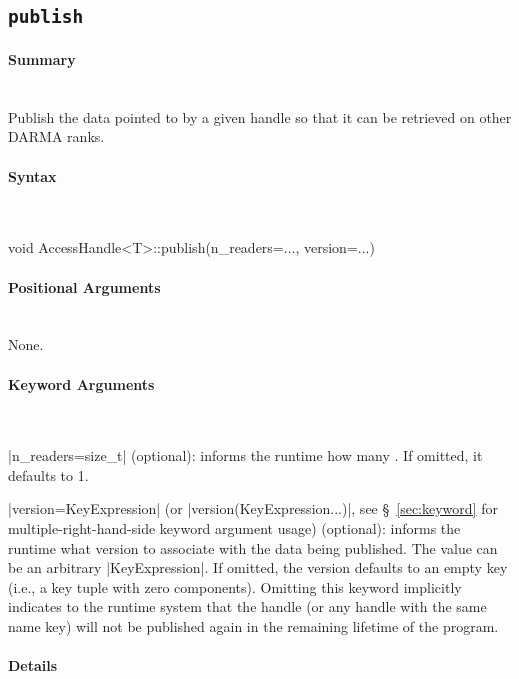 \subsection{\texttt{publish}}
\label{ssec:api_fe_publish}

\paragraph{Summary} \mbox{}\\
Publish the data pointed to by a given handle so that it can be retrieved on 
other DARMA ranks.

\paragraph{Syntax} \mbox{}\\
\begin{CppCode}
void
AccessHandle<T>::publish(n_readers=..., version=...)
\end{CppCode}

\paragraph{Positional Arguments} \mbox{}\\
None.

\paragraph{Keyword Arguments} \mbox{}\\
\begin{compactitem}
\item |n_readers=size_t| (optional): informs the runtime how many .
If omitted, it defaults to 1.
\item |version=KeyExpression| (or |version(KeyExpression...)|,
see \S~\ref{sec:keyword} for multiple-right-hand-side keyword argument usage)
(optional):
informs the runtime what version to associate with the data being published. 
The value can be an arbitrary |KeyExpression|.
If omitted, the version defaults to an empty key (i.e., a key tuple with zero 
components).  Omitting this keyword implicitly indicates to the runtime system
that the handle (or any handle with the same name key) will not be published
again in the remaining lifetime of the program.
\end{compactitem}

\paragraph{Details} \mbox{}\\

